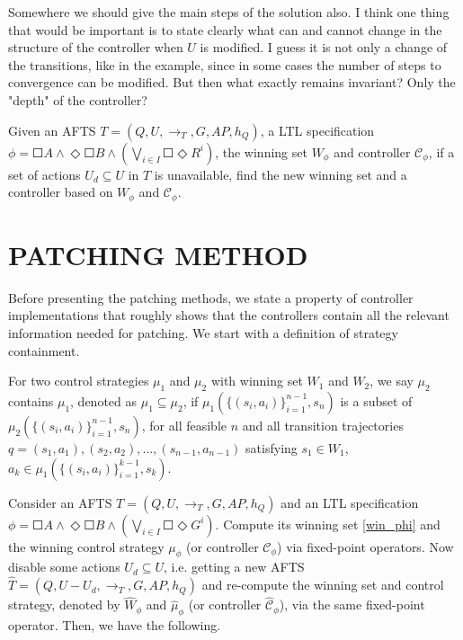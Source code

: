 {\color{purple} Somewhere we should give the main steps of the solution also. I think one thing that would be important is to state clearly what can and cannot change in the structure of the controller when $U$ is modified. I guess it is not only a change of the transitions, like in the example, since in some cases the number of steps to convergence can be modified. But then what exactly remains invariant? Only the "depth" of the controller? }

\begin{problem}
	Given an AFTS $ T = (Q,U,\rightarrow_T,G,AP,h_Q) $, a LTL specification $ \phi = \Square A \wedge \Diamond \Square B \wedge \left( \bigvee_{i\in I} \Square \Diamond R^i\right) $, the winning set $ W_{\phi} $ and controller $ \mathcal{C}_{\phi} $, if a set of actions $ U_d\subseteq U $ in $ T $ is unavailable, find the new winning set and a controller based on $ W_{\phi} $ and $ \mathcal{C}_{\phi} $.
\end{problem}


\section{PATCHING METHOD}
\label{sec:method}

Before presenting the patching methods, we state a property of controller implementations that roughly shows that the controllers contain all the relevant information needed for patching. We start with a definition of strategy containment.

\begin{definition}
	For two control strategies $ \mu_1 $ and $ \mu_2 $ with winning set $ W_1 $ and $ W_2 $, we say $ \mu_2 $ contains $ \mu_1$, denoted as $ \mu_{1} \subseteq \mu_{2}$, if $ \mu_{1} (\{(s_i,a_i)\}_{i=1}^{n-1}, s_n) $ is a subset of $ \mu_{2}(\{(s_i,a_i)\}_{i=1}^{n-1}, s_n) $, for all feasible $ n $ and all transition trajectories $ q =(s_1,a_1),(s_2,a_2),...,(s_{n-1},a_{n-1}) $ satisfying $ s_1\in W_{1} $, $ a_k \in \mu_{1} (\{(s_i,a_i)\}_{i=1}^{k-1}, s_k) $.
\end{definition}

Consider an AFTS $ T = (Q,U,\rightarrow_T,G,AP,h_Q) $ and {\color{blue} an} LTL specification $ \phi = \Square A \wedge \Diamond \Square B \wedge \left( \bigvee_{i\in I} \Square \Diamond G^i\right) $. Compute its winning set \eqref{win_phi} and the winning control strategy $ \mu_{\phi} $ (or controller $ \mathcal{C}_{\phi} $) via fixed-point operators. Now disable some actions $ U_d \subseteq U$, i.e. getting a new AFTS $ \widehat{T} = (Q,U-U_d,\rightarrow_T,G,AP,h_Q) $ and re-compute the winning set and control strategy, denoted by $ \widehat{W}_{\phi} $ and $ \widehat{\mu}_{\phi} $ (or controller $ \widehat{\mathcal{C}}_{\phi} $), via the same fixed-point operator. Then, we have the following.



